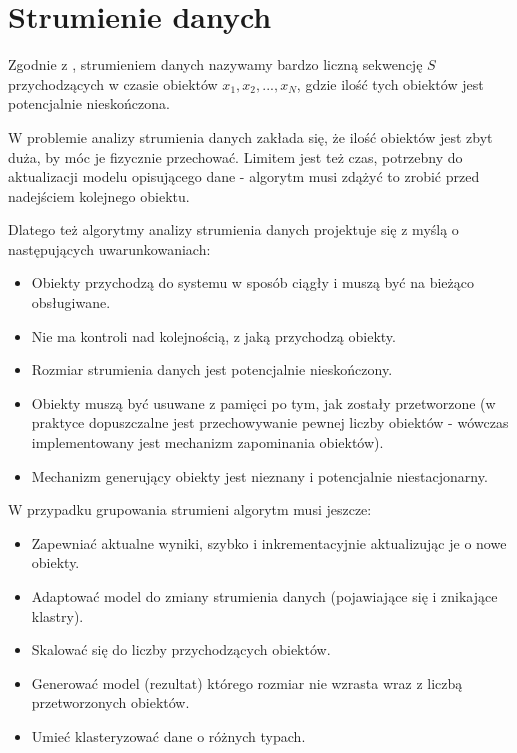 \documentclass[11pt]{mgr}
\begin{document}
\section{Strumienie danych}\label{strumienie-danych-1}

Zgodnie z \cite{silva2013data}, strumieniem danych nazywamy bardzo liczną sekwencję \(S\) przychodzących w czasie obiektów \(x_{1}, x_{2}, ... , x_{N}\), gdzie ilość tych obiektów jest potencjalnie nieskończona.

W problemie analizy strumienia danych zakłada się, że ilość obiektów jest zbyt duża, by móc je fizycznie przechować. Limitem jest też czas, potrzebny do aktualizacji modelu opisującego dane - algorytm musi zdążyć to zrobić przed nadejściem kolejnego obiektu. 

Dlatego też algorytmy analizy strumienia danych projektuje się z myślą o następujących uwarunkowaniach: 
\begin{itemize}
\item Obiekty przychodzą do systemu w sposób ciągły i muszą być na bieżąco obsługiwane.
\item Nie ma kontroli nad kolejnością, z jaką przychodzą obiekty.
\item Rozmiar strumienia danych jest potencjalnie nieskończony.
\item Obiekty muszą być usuwane z pamięci po tym, jak zostały przetworzone (w praktyce dopuszczalne jest przechowywanie pewnej liczby obiektów - wówczas implementowany jest mechanizm zapominania obiektów).
\item Mechanizm generujący obiekty jest nieznany i potencjalnie niestacjonarny.
\end{itemize}

W przypadku grupowania strumieni algorytm musi jeszcze:

\begin{itemize}
\item Zapewniać aktualne wyniki, szybko i inkrementacyjnie aktualizując je o nowe obiekty.
\item Adaptować model do zmiany strumienia danych (pojawiające się i znikające klastry).
\item Skalować się do liczby przychodzących obiektów.
\item Generować model (rezultat) którego rozmiar nie wzrasta wraz z liczbą przetworzonych obiektów.
\item Umieć klasteryzować dane o różnych typach.
\end{itemize}
\end{document}
